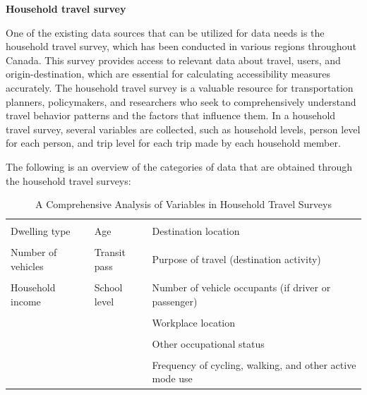 \documentclass[12pt,twoside]{reedthesis}
\begin{document}
\textbf{Household travel survey}

One of the existing data sources that can be utilized for data needs is the household travel survey, which has been conducted in various regions throughout Canada. This survey provides access to relevant data about travel, users, and origin-destination, which are essential for calculating accessibility measures accurately. The household travel survey is a valuable resource for transportation planners, policymakers, and researchers who seek to comprehensively understand travel behavior patterns and the factors that influence them. In a household travel survey, several variables are collected, such as household levels, person level for each person, and trip level for each trip made by each household member.

The following is an overview of the categories of data that are obtained through the household travel surveys:
\begin{table}

\caption{\label{tab:unnamed-chunk-10}\label{tab:table_6}A Comprehensive Analysis of Variables in Household Travel Surveys}
\centering
\fontsize{10}{12}\selectfont
\begin{tabular}[t]{>{\raggedright\arraybackslash}p{5cm}>{\raggedright\arraybackslash}p{5cm}>{\raggedright\arraybackslash}p{5cm}}
\toprule
\multicolumn{1}{>{\centering\arraybackslash}p{5cm}}{\textbf{Household levels}} & \multicolumn{1}{>{\centering\arraybackslash}p{5cm}}{\textbf{Person level}} & \multicolumn{1}{>{\centering\arraybackslash}p{5cm}}{\textbf{Trip level}}\\
\midrule
\cellcolor{gray!6}{Home location} & \cellcolor{gray!6}{Gender} & \cellcolor{gray!6}{Origin location}\\
Dwelling type & Age & Destination location\\
\cellcolor{gray!6}{Household size (\# people)} & \cellcolor{gray!6}{Driver’s licence} & \cellcolor{gray!6}{Trip departure time (start and end time)}\\
Number of vehicles & Transit pass & Purpose of travel (destination activity)\\
\cellcolor{gray!6}{Number of bicycles} & \cellcolor{gray!6}{Student status} & \cellcolor{gray!6}{Mode(s) of travel (up to 5)}\\
\addlinespace
Household income & School level & Number of vehicle occupants (if driver or passenger)\\
\cellcolor{gray!6}{Home parking (\#off-street spots)} & \cellcolor{gray!6}{School location} & \cellcolor{gray!6}{Employment status}\\
 &  & Workplace location\\
\cellcolor{gray!6}{} & \cellcolor{gray!6}{} & \cellcolor{gray!6}{Parking at work and school(free or pay)}\\
 &  & Other occupational status\\
\addlinespace
\cellcolor{gray!6}{} & \cellcolor{gray!6}{} & \cellcolor{gray!6}{Location of residence}\\
 &  & Frequency of cycling, walking, and other active mode use\\
\bottomrule
\end{tabular}
\end{table}
\end{document}

